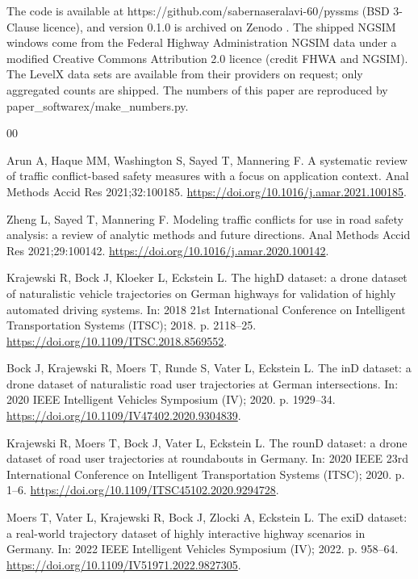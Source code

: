 \documentclass[preprint,12pt, a4paper]{elsarticle}
\begin{document}
The code is available at https://github.com/sabernaseralavi-60/pyssms (BSD 3-Clause licence), and version 0.1.0 is archived on Zenodo \cite{pyssms_zenodo}. The shipped NGSIM windows come from the Federal Highway Administration NGSIM data under a modified Creative Commons Attribution 2.0 licence (credit FHWA and NGSIM). The LevelX data sets are available from their providers on request; only aggregated counts are shipped. The numbers of this paper are reproduced by paper\_softwarex/make\_numbers.py.

\begin{thebibliography}{00}

 Arun A, Haque MM, Washington S, Sayed T, Mannering F. A systematic review of traffic conflict-based safety measures with a focus on application context. Anal Methods Accid Res 2021;32:100185. \url{https://doi.org/10.1016/j.amar.2021.100185}.

 Zheng L, Sayed T, Mannering F. Modeling traffic conflicts for use in road safety analysis: a review of analytic methods and future directions. Anal Methods Accid Res 2021;29:100142. \url{https://doi.org/10.1016/j.amar.2020.100142}.

 Krajewski R, Bock J, Kloeker L, Eckstein L. The highD dataset: a drone dataset of naturalistic vehicle trajectories on German highways for validation of highly automated driving systems. In: 2018 21st International Conference on Intelligent Transportation Systems (ITSC); 2018. p. 2118--25. \url{https://doi.org/10.1109/ITSC.2018.8569552}.

 Bock J, Krajewski R, Moers T, Runde S, Vater L, Eckstein L. The inD dataset: a drone dataset of naturalistic road user trajectories at German intersections. In: 2020 IEEE Intelligent Vehicles Symposium (IV); 2020. p. 1929--34. \url{https://doi.org/10.1109/IV47402.2020.9304839}.

 Krajewski R, Moers T, Bock J, Vater L, Eckstein L. The rounD dataset: a drone dataset of road user trajectories at roundabouts in Germany. In: 2020 IEEE 23rd International Conference on Intelligent Transportation Systems (ITSC); 2020. p. 1--6. \url{https://doi.org/10.1109/ITSC45102.2020.9294728}.

 Moers T, Vater L, Krajewski R, Bock J, Zlocki A, Eckstein L. The exiD dataset: a real-world trajectory dataset of highly interactive highway scenarios in Germany. In: 2022 IEEE Intelligent Vehicles Symposium (IV); 2022. p. 958--64. \url{https://doi.org/10.1109/IV51971.2022.9827305}.


\end{thebibliography}
\end{document}
